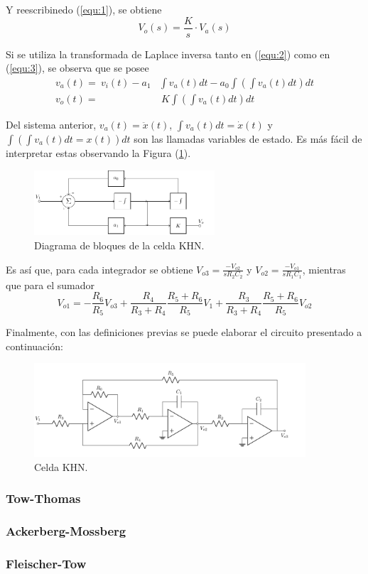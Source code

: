 Y reescribinedo (\ref{equ:1}), se obtiene
\begin{equation}
	V_o(s) = \frac{K}{s} \cdot V_a(s)
	\label{equ:3}
\end{equation}

Si se utiliza la transformada de Laplace inversa tanto en (\ref{equ:2}) como en (\ref{equ:3}), se observa que se posee
\begin{equation}
\begin{split}
	v_a(t) =\ v_i(t) - a_1 & \int v_a(t)dt - a_0 \int \left( \int v_a(t)dt \right) dt \\
	v_o(t) =& \ K\int \left( \int v_a(t)dt \right) dt
\end{split}
\end{equation}

Del sistema anterior, $v_a(t) = \ddot{x}(t) $, $\int v_a(t)dt = \dot{x}(t)$ y $\int \left( \int v_a(t)dt = x(t) \right) dt$ son las llamadas variables de estado. Es más fácil de interpretar estas observando la Figura (\ref{fig:block}).

\begin{figure}[H]
\centering
	\includegraphics[width=0.6\textwidth]{ImagenesEjercicio4/Diagrama-De-Bloques.pdf}
	\caption{Diagrama de bloques de la celda KHN.}
	\label{fig:block}
\end{figure}

Es así que, para cada integrador se obtiene $V_{o3} = \frac{-V_{o2}}{sR_2C_2}$ y
$V_{o2} = \frac{-V_{o1}}{sR_1C_1}$, mientras que para el sumador
\begin{equation*}
	V_{o1} = -\frac{R_6}{R_5} V_{o3} + \frac{R_4}{R_3 + R_4} \frac{R_5 + R_6}{R_5} V_1 + \frac{R_3}{R_3 + R_4} \frac{R_5 + R_6}{R_5} V_{o2}
\end{equation*}

Finalmente, con las definiciones previas se puede elaborar el circuito presentado a continuación:
\begin{figure}[H]
\centering
	\includegraphics[width=0.9\textwidth]{ImagenesEjercicio4/KHN.pdf}
	\caption{Celda KHN.}
	\label{fig:KHN}
\end{figure}

\subsubsection{Tow-Thomas}

\subsubsection{Ackerberg-Mossberg}

\subsubsection{Fleischer-Tow}


